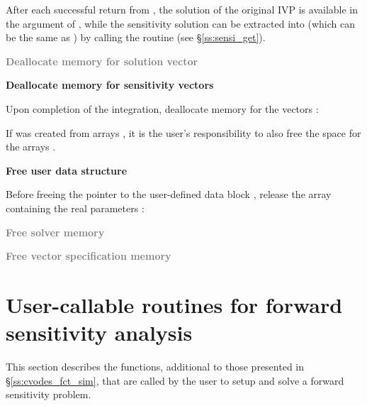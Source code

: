 \begin{Steps}
  After each successful return from , the solution of the
  original IVP is available in the  argument of ,
  while the sensitivity solution can be extracted into  (which can 
  be the same as ) by calling the routine 
  (see \S\ref{ss:sensi_get}).

\item
  \textcolor{gray}{\bf Deallocate memory for solution vector}

\item 
  {\bf Deallocate memory for sensitivity vectors}

  Upon completion of the integration, deallocate memory for the vectors :

  {\s} 

  {\p} 

  If  was created from  arrays , it is the
  user's responsibility to also free the space for the arrays .

\item
  {\bf Free user data structure}

  Before freeing the pointer to the user-defined data block 
  , release the array containing the real parameters :

\item
  \textcolor{gray}{\bf Free solver memory}
  
\item
  \textcolor{gray}{\bf Free vector specification memory}

\end{Steps}

\section{User-callable routines for forward sensitivity analysis}

This section describes the {\cvodes} functions, additional to those presented
in \S\ref{ss:cvodes_fct_sim}, that are called by the user to setup and solve
a forward sensitivity problem.


